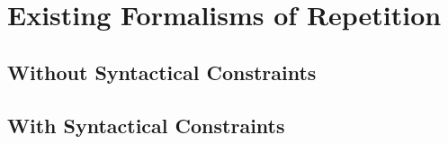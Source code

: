 \section{Existing Formalisms of Repetition}
        \subsection{Without Syntactical Constraints}
        \subsection{With Syntactical Constraints}